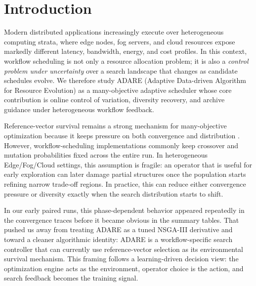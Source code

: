 \documentclass[preprint,12pt]{elsarticle}
\begin{document}
\section{Introduction}
\begin{sloppypar}
Modern distributed applications increasingly execute over heterogeneous computing strata, where edge nodes, fog servers, and cloud resources expose markedly different latency, bandwidth, energy, and cost profiles. In this context, workflow scheduling is not only a resource allocation problem; it is also a \emph{control problem under uncertainty} over a search landscape that changes as candidate schedules evolve. We therefore study ADARE (Adaptive Data-driven Algorithm for Resource Evolution) as a many-objective adaptive scheduler whose core contribution is online control of variation, diversity recovery, and archive guidance under heterogeneous workflow feedback.
\end{sloppypar}

Reference-vector survival remains a strong mechanism for many-objective optimization because it keeps pressure on both convergence and distribution \cite{deb2014nsga3}. However, workflow-scheduling implementations commonly keep crossover and mutation probabilities fixed across the entire run. In heterogeneous Edge/Fog/Cloud settings, this assumption is fragile: an operator that is useful for early exploration can later damage partial structures once the population starts refining narrow trade-off regions. In practice, this can reduce either convergence pressure or diversity exactly when the search distribution starts to shift.

In our early paired runs, this phase-dependent behavior appeared repeatedly in the convergence traces before it became obvious in the summary tables. That pushed us away from treating ADARE as a tuned NSGA-III derivative and toward a cleaner algorithmic identity: ADARE is a workflow-specific search controller that can currently use reference-vector selection as its environmental survival mechanism. This framing follows a learning-driven decision view: the optimization engine acts as the environment, operator choice is the action, and search feedback becomes the training signal.
\end{document}
